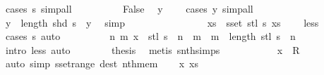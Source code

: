 \begin{isabellebody}
\ {\isacharparenleft}cases\ s{\isacharparenright}\ simp{\isacharunderscore}all\isanewline
\ \ \ \ \ \ \ \ \isamarkupfalse%
\ False\ \isamarkupfalse%
\ {\isachardoublequoteopen}y\ {\isachargreater}\ {}{\isachardoublequoteclose}\ \isamarkupfalse%
\ {\isacharparenleft}cases\ y{\isacharparenright}\ simp{\isacharunderscore}all\isanewline
\ \ \ \ \ \ \ \ \isamarkupfalse%
\ {\isacharasterisk}\ \isamarkupfalse%
\ {\isachardoublequoteopen}y\ {\isacharminus}\ length\ {\isacharparenleft}shd\ s{\isacharparenright}\ {\isacharless}\ y{\isachardoublequoteclose}\ \isamarkupfalse%
\ simp\isanewline
\ \ \ \ \ \ \isacommand{{\isacharbraceright}}\isamarkupfalse%
\isanewline
\ \ \ \ \ \ \isamarkupfalse%
\ \isamarkupfalse%
\ {\isachardoublequoteopen}{\isasymforall}xs\ {\isasymin}\ sset\ {\isacharparenleft}stl\ s{\isacharparenright}{\isachardot}\ xs\ {\isasymnoteq}\ {\isacharbrackleft}{\isacharbrackright}{\isachardoublequoteclose}\ \isamarkupfalse%
\ less{\isacharparenleft}{}{\isacharparenright}\ \isamarkupfalse%
\ {\isacharparenleft}cases\ s{\isacharparenright}\ auto\isanewline
\ \ \ \ \ \ \isamarkupfalse%
\ \isamarkupfalse%
\ {\isachardoublequoteopen}{\isasymexists}n\ m{\isacharprime}{\isachardot}\ x\ {\isacharequal}\ stl\ s\ {\isacharbang}{\isacharbang}\ n\ {\isacharbang}\ m{\isacharprime}\ {\isasymand}\ m{\isacharprime}\ {\isacharless}\ length\ {\isacharparenleft}stl\ s\ {\isacharbang}{\isacharbang}\ n{\isacharparenright}{\isachardoublequoteclose}\ \isamarkupfalse%
\ {\isacharparenleft}intro\ less{\isacharparenleft}{}{\isacharparenright}{\isacharparenright}\ auto\isanewline
\ \ \ \ \ \ \isamarkupfalse%
\ {\isacharquery}thesis\ \isamarkupfalse%
\ {\isacharparenleft}metis\ snth{\isachardot}simps{\isacharparenleft}{}{\isacharparenright}{\isacharparenright}\isanewline
\ \ \ \ \isamarkupfalse%
\isanewline
\ \ \isamarkupfalse%
\isanewline
\ \ \isamarkupfalse%
\ {\isachardoublequoteopen}x\ {\isasymin}\ {\isacharquery}R{\isachardoublequoteclose}\ \isamarkupfalse%
\ {\isacharparenleft}auto\ simp{\isacharcolon}\ sset{\isacharunderscore}range\ dest{\isacharbang}{\isacharcolon}\ nth{\isacharunderscore}mem{\isacharparenright}\isanewline
{}\isamarkupfalse%
\isanewline
\ \ \isamarkupfalse%
\ x\ xs\ \isamarkupfalse%

\end{isabellebody}
